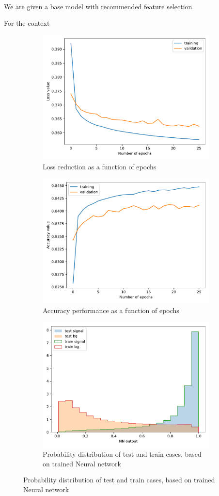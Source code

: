 \documentclass[]{article}
\begin{document}
We are given a base model with recommended feature selection.

For the context
\begin{figure}[ht]

	\begin{subfigure}{\textwidth}
		\centering
		\includegraphics[height=.5\linewidth]{base_model/base_loss.pdf}
		\caption{Loss reduction as a function of epochs}
	\end{subfigure}%
	\vspace{0.2cm} %
	
	\begin{subfigure}{\textwidth}
	\centering
		\includegraphics[height=.5\linewidth]{base_model/base_accuracy.pdf}
		\caption{Accuracy performance as a function of epochs}
	
	\end{subfigure}
	\vspace{0.2cm} %
	
	\begin{subfigure}{\textwidth}
		\centering
		\includegraphics[height=.5\linewidth]{base_model/base_NNout.pdf}
		\caption{Probability distribution of test and train cases, based on trained Neural network}
	\end{subfigure}
	

\end{figure}
\end{document}
